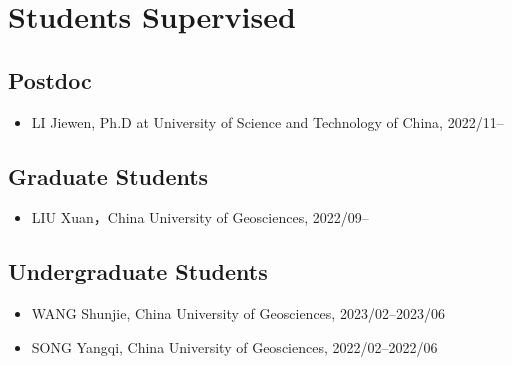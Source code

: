 \section{Students Supervised}

\subsection{Postdoc}
\begin{itemize}
\item LI Jiewen, Ph.D at University of Science and Technology of China, 2022/11--
\end{itemize}

\subsection{Graduate Students}
\begin{itemize}
\item LIU Xuan，China University of Geosciences, 2022/09--
\end{itemize}

\subsection{Undergraduate Students}
\begin{itemize}
\item WANG Shunjie, China University of Geosciences, 2023/02--2023/06
\item SONG Yangqi, China University of Geosciences, 2022/02--2022/06
\end{itemize}
